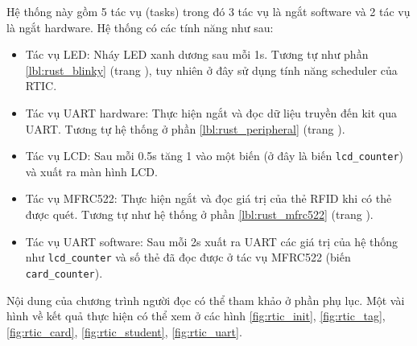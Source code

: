 Hệ thống này gồm 5 tác vụ (tasks) trong đó 3 tác vụ là ngắt software và 2 tác vụ là ngắt hardware.
Hệ thống có các tính năng như sau:
\begin{itemize}
    \item Tác vụ LED: Nháy LED xanh dương sau mỗi 1s. Tương tự như phần \ref{lbl:rust_blinky} (trang \pageref{lbl:rust_blinky}), tuy nhiên ở đây sử dụng tính năng scheduler của RTIC.
    \item Tác vụ UART hardware: Thực hiện ngắt và đọc dữ liệu truyền đến kit qua UART. Tương tự hệ thống ở phần \ref{lbl:rust_peripheral} (trang \pageref{lbl:rust_peripheral}).
    \item Tác vụ LCD: Sau mỗi 0.5s tăng 1 vào một biến (ở đây là biến \texttt{lcd_counter}) và xuất ra màn hình LCD.
    \item Tác vụ MFRC522: Thực hiện ngắt và đọc giá trị của thẻ RFID khi có thẻ được quét. Tương tự như hệ thống ở phần \ref{lbl:rust_mfrc522} (trang \pageref{lbl:rust_mfrc522}).
    \item Tác vụ UART software: Sau mỗi 2s xuất ra UART các giá trị của hệ thống như \texttt{lcd_counter} và số thẻ đã đọc được ở tác vụ MFRC522 (biến \texttt{card_counter}).
\end{itemize}

Nội dung của chương trình người đọc có thể tham khảo ở phần phụ lục. %
Một vài hình về kết quả thực hiện có thể xem ở các hình \ref{fig:rtic_init}, \ref{fig:rtic_tag}, \ref{fig:rtic_card}, \ref{fig:rtic_student}, \ref{fig:rtic_uart}.

